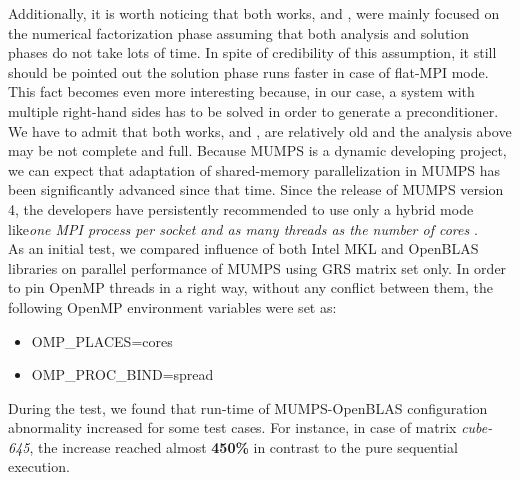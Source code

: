 Additionally, it is worth noticing that both works, \cite{chowdhury2010some} and \cite{l2013introduction}, were mainly focused on the numerical factorization phase assuming that both analysis and solution phases do not take lots of time. In spite of credibility of this assumption, it still should be pointed out the solution phase runs faster in case of flat-MPI mode. This fact becomes even more interesting because, in our case, a system with multiple right-hand sides has to be solved in order to generate a preconditioner.\\


We have to admit that both works, \cite{chowdhury2010some} and \cite{l2013introduction}, are relatively old and the analysis above may be not complete and full. Because MUMPS is a dynamic developing project, we can expect that adaptation of shared-memory parallelization in MUMPS has been significantly advanced since that time. Since the release of MUMPS version 4, the developers have persistently recommended to use only a hybrid mode like\textit{one MPI process per socket and as many threads as the number of cores} \cite{mumps-manual}.\\


As an initial test, we compared influence of both Intel MKL and OpenBLAS libraries on parallel performance of MUMPS using GRS matrix set only. In order to pin OpenMP threads in a right way, without any conflict between them, the following OpenMP environment variables were set as:

\begin{itemize}
	\item OMP\_PLACES=cores
	\item OMP\_PROC\_BIND=spread
\end{itemize} 


During the test, we found that run-time of MUMPS-OpenBLAS configuration abnormality increased for some test cases. For instance, in case of matrix \textit{cube-645}, the increase reached almost \textbf{450\%} in contrast to the pure sequential execution. \\

